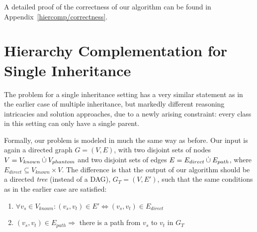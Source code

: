 
A detailed proof of the correctness of our algorithm can be found in
Appendix~\ref{hiercomp/correctness}.



\section{Hierarchy Complementation for Single Inheritance}
\label{hiercomp/single}

The problem for a single inheritance setting has a very similar
statement as in the earlier case of multiple inheritance, but markedly
different reasoning intricacies and solution approaches, due to a newly
arising constraint: every class in this setting can only have a
single parent.

Formally, our problem is modeled in much the same way as before. Our
input is again a directed graph $G = (V,E)$, with two disjoint sets of
nodes $V = V_{known} \mathbin{\dot{\cup}} V_{phantom}$ and two disjoint sets of edges
$E = E_{direct} \mathbin{\dot{\cup}} E_{path}$, where $E_{direct} \subseteq V_{known}
\times V$.  The difference is that the output of our algorithm should
be a directed \emph{tree} (instead of a DAG), $G_T = (V,E')$, such
that the same conditions as in the earlier case are satisfied:
\begin{enumerate}
\item
  \(\forall v_s \in V_{known}: (v_s,v_t) \in E' \Leftrightarrow (v_s,
  v_t) \in E_{direct}\)
\item \((v_s,v_t) \in E_{path} \Rightarrow\) there is a path from
  \(v_s\) to \(v_t\) in \(G_T\)
\end{enumerate}

